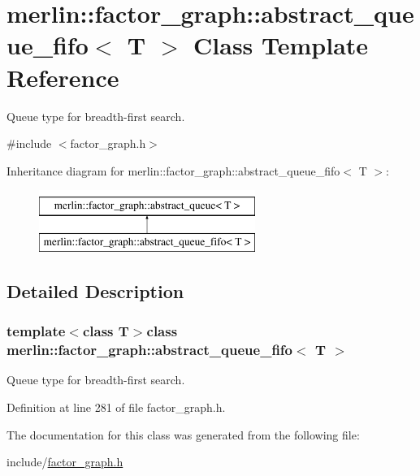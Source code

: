 \hypertarget{classmerlin_1_1factor__graph_1_1abstract__queue__fifo}{}\section{merlin\+:\+:factor\+\_\+graph\+:\+:abstract\+\_\+queue\+\_\+fifo$<$ T $>$ Class Template Reference}
\label{classmerlin_1_1factor__graph_1_1abstract__queue__fifo}


Queue type for breadth-\/first search.  




{\ttfamily \#include $<$factor\+\_\+graph.\+h$>$}

Inheritance diagram for merlin\+:\+:factor\+\_\+graph\+:\+:abstract\+\_\+queue\+\_\+fifo$<$ T $>$\+:\begin{figure}[H]
\begin{center}
\leavevmode
\includegraphics[height=2.000000cm]{classmerlin_1_1factor__graph_1_1abstract__queue__fifo}
\end{center}
\end{figure}


\subsection{Detailed Description}
\subsubsection*{template$<$class T$>$class merlin\+::factor\+\_\+graph\+::abstract\+\_\+queue\+\_\+fifo$<$ T $>$}

Queue type for breadth-\/first search. 

Definition at line 281 of file factor\+\_\+graph.\+h.



The documentation for this class was generated from the following file\+:\begin{DoxyCompactItemize}
\item 
include/\hyperlink{factor__graph_8h}{factor\+\_\+graph.\+h}\end{DoxyCompactItemize}

